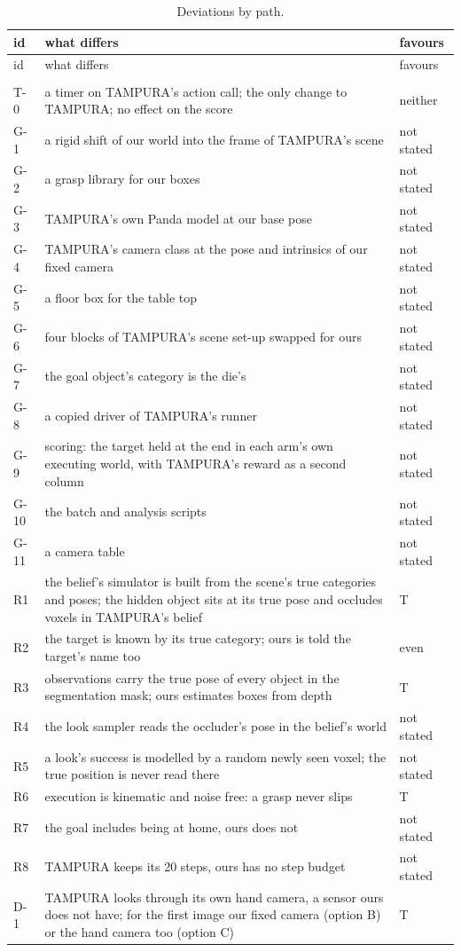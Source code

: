 \begin{footnotesize}
\begin{longtable}{@{}P{1.25cm}P{9.2cm}P{2.5cm}@{}}
\caption{Deviations by path.}\label{tab:deviations}\\
\toprule
id & what differs & favours \\
\midrule
\endfirsthead
\toprule
id & what differs & favours \\
\midrule
\endhead
\bottomrule
\endfoot

 \\
T-0 & a timer on TAMPURA's action call; the only change to TAMPURA; no effect on the
score & neither \\
G-1 & a rigid shift of our world into the frame of TAMPURA's scene & not stated \\
G-2 & a grasp library for our boxes & not stated \\
G-3 & TAMPURA's own Panda model at our base pose & not stated \\
G-4 & TAMPURA's camera class at the pose and intrinsics of our fixed camera & not
stated \\
G-5 & a floor box for the table top & not stated \\
G-6 & four blocks of TAMPURA's scene set-up swapped for ours & not stated \\
G-7 & the goal object's category is the die's & not stated \\
G-8 & a copied driver of TAMPURA's runner & not stated \\
G-9 & scoring: the target held at the end in each arm's own executing world, with
TAMPURA's reward as a second column & not stated \\
G-10 & the batch and analysis scripts & not stated \\
G-11 & a camera table & not stated \\
R1 & the belief's simulator is built from the scene's true categories and poses; the
hidden object sits at its true pose and occludes voxels in TAMPURA's belief & T \\
R2 & the target is known by its true category; ours is told the target's name too &
even \\
R3 & observations carry the true pose of every object in the segmentation mask; ours
estimates boxes from depth & T \\
R4 & the look sampler reads the occluder's pose in the belief's world & not stated \\
R5 & a look's success is modelled by a random newly seen voxel; the true position is
never read there & not stated \\
R6 & execution is kinematic and noise free: a grasp never slips & T \\
R7 & the goal includes being at home, ours does not & not stated \\
R8 & TAMPURA keeps its 20 steps, ours has no step budget & not stated \\
D-1 & TAMPURA looks through its own hand camera, a sensor ours does not have; for
the first image our fixed camera (option B) or the hand camera too (option C) & T \\
\midrule


\end{longtable}
\end{footnotesize}
